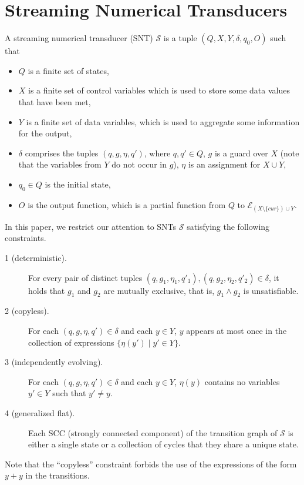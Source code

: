 \documentclass[runningheads,a4paper]{llncs}
\def\Ee{{\mathcal{E} }}
\def\Nn{{\mathbb{N} }}
\def\Ss{{\mathcal{S} }}
\newcommand{\zhilin}[1]{\color{cyan} {ZL: #1 :LZ} \color{black}}
\newcommand{\lei}[1]{\color{green} {LE: #1 :EL} \color{black}}
\begin{document}
\section{Streaming Numerical Transducers}
A streaming numerical transducer (SNT) $\Ss$ is a tuple $(Q, X, Y, \delta, q_0, O)$ such that 
\begin{itemize}
\item $Q$ is a finite set of states,
\item $X$ is a finite set of control variables which is used to store some data values that have been met,
\item $Y$ is a finite set of data variables, which is used to aggregate some information for the output,
\item $\delta$ comprises the tuples $(q,  g, \eta, q')$, where $q,q'\in Q$, $g$ is a guard over $X$ (note that the variables from $Y$ do not occur in $g$), $\eta$ is an assignment for $X \cup Y$, 
\item $q_0 \in Q$ is the initial state,
\item $O$ is the output function, which is a partial function from $Q$ to $\Ee_{(X \setminus \{cur\}) \cup Y}$.
\end{itemize}


In this paper, we restrict our attention to SNTs $\Ss$ satisfying the following constraints.
\begin{description}
\item [1 (deterministic).] For every pair of distinct tuples $(q, g_1, \eta_1,q'_1), (q, g_2,\eta_2,q'_2) \in \delta$, it holds that $g_1$ and $g_2$ are mutually exclusive, that is, $g_1 \wedge g_2$ is unsatisfiable.
%
\item[2 (copyless).] For each $(q, g, \eta, q') \in \delta$ and each $y \in Y$, $y$ appears at most once in the collection of expressions $\{\eta(y') \mid y' \in Y\}$.
%
\item[3 (independently evolving).] For each $(q, g, \eta, q') \in \delta$ and each $y \in Y$, $\eta(y)$ contains no variables $y' \in Y$ such that $y' \neq y$.
%
\item [4 (generalized flat).] Each SCC (strongly connected component) of the transition graph of $\Ss$ is either a single state or a collection of cycles that they share a unique state.
\end{description}
Note that the ``copyless'' constraint forbids the use of the expressions of the form $y+y$ in the transitions.
\end{document}
